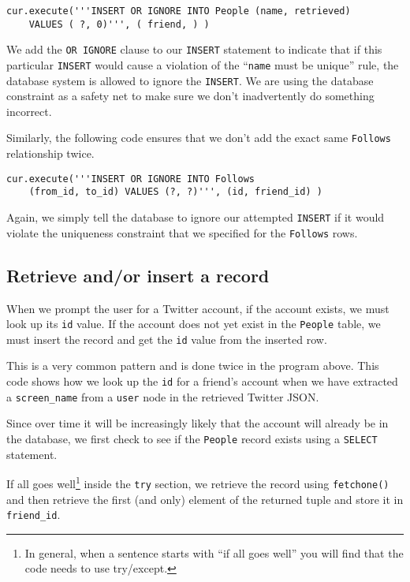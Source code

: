 \beforeverb
\begin{verbatim}
cur.execute('''INSERT OR IGNORE INTO People (name, retrieved) 
    VALUES ( ?, 0)''', ( friend, ) )
\end{verbatim}
\afterverb
%
We add the {\tt OR IGNORE} clause to our {\tt INSERT} statement to indicate
that if this particular {\tt INSERT} would cause a violation of the
``{\tt name} must be unique'' rule, the database system is allowed to ignore the 
{\tt INSERT}.  We are using the database constraint as a safety net
to make sure we don't inadvertently do something incorrect.

Similarly, the following code ensures that we don't add the 
exact same {\tt Follows} relationship twice.

\beforeverb
\begin{verbatim}
cur.execute('''INSERT OR IGNORE INTO Follows 
    (from_id, to_id) VALUES (?, ?)''', (id, friend_id) )
\end{verbatim}
\afterverb
%
Again, we simply tell the database to ignore our attempted 
{\tt INSERT} if it would violate the uniqueness constraint
that we specified for the {\tt Follows} rows.

\subsection{Retrieve and/or insert a record}

When we prompt the user for a Twitter account, if the account 
exists, we must look up its {\tt id} value.  If the account
does not yet exist in the {\tt People} table, we must insert 
the record and get the {\tt id} value from the inserted
row.

This is a very common pattern and is done twice in the program above.
This code shows how we look up the {\tt id} for a 
friend's account when we have extracted a \verb"screen_name"
from a {\tt user} node in the retrieved Twitter JSON.

Since over time it will be increasingly likely that the account
will already be in the database, we first check to see if the
{\tt People} record exists using a {\tt SELECT} statement.

If all goes well\footnote{In general, when a sentence starts 
with ``if all goes well'' you will find that the code needs
to use try/except.} inside the {\tt try} section, we retrieve the
record using {\tt fetchone()} and then retrieve the
first (and only) element of the returned tuple and store it in 
\verb"friend_id".

